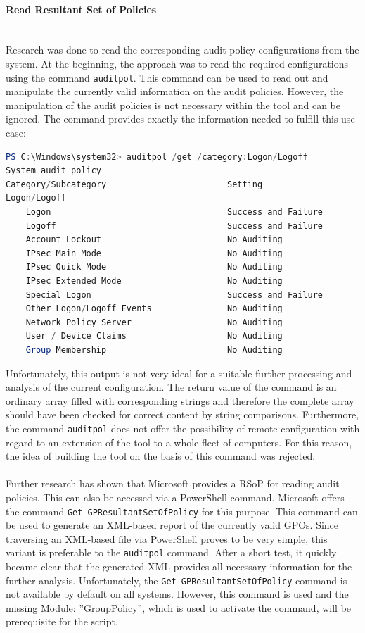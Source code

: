 \paragraph{Read Resultant Set of Policies} \ \\
Research was done to read the corresponding audit policy configurations from the system. At the beginning, the approach was to read the required configurations using the command \lstinline|auditpol|. \cite{auditpol} This command can be used to read out and manipulate the currently valid information on the audit policies. However, the manipulation of the audit policies is not necessary within the tool and can be ignored. The command provides exactly the information needed to fulfill this use case:
\begin{lstlisting}[caption=auditpol, language=PowerShell]
PS C:\Windows\system32> auditpol /get /category:Logon/Logoff
System audit policy
Category/Subcategory                        Setting
Logon/Logoff
    Logon                                   Success and Failure
    Logoff                                  Success and Failure
    Account Lockout                         No Auditing
    IPsec Main Mode                         No Auditing
    IPsec Quick Mode                        No Auditing
    IPsec Extended Mode                     No Auditing
    Special Logon                           Success and Failure
    Other Logon/Logoff Events               No Auditing
    Network Policy Server                   No Auditing
    User / Device Claims                    No Auditing
    Group Membership                        No Auditing
\end{lstlisting}
Unfortunately, this output is not very ideal for a suitable further processing and analysis of the current configuration. The return value of the command is an ordinary array filled with corresponding strings and therefore the complete array should have been checked for correct content by string comparisons. Furthermore, the command \lstinline|auditpol| does not offer the possibility of remote configuration with regard to an extension of the tool to a whole fleet of computers. For this reason, the idea of building the tool on the basis of this command was rejected.
\\\\
Further research has shown that Microsoft provides a RSoP \cite{RSoP} for reading audit policies. This can also be accessed via a PowerShell command. Microsoft offers the command \lstinline|Get-GPResultantSetOfPolicy| \cite{GetGPResultantSetOfPolicy} for this purpose. This command can be used to generate an XML-based report of the currently valid GPOs. Since traversing an XML-based file via PowerShell proves to be very simple, this variant is preferable to the \lstinline|auditpol| command. After a short test, it quickly became clear that the generated XML provides all necessary information for the further analysis. Unfortunately, the \lstinline|Get-GPResultantSetOfPolicy| command is not available by default on all systems. However, this command is used and the missing Module: ''GroupPolicy'', which is used to activate the command, will be prerequisite for the script. \cite{GroupPolicy} \cite{RSAT}


